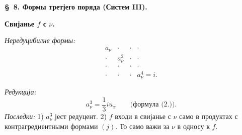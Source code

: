 ﻿\documentclass[11pt]{article}
\begin{document}
\begin{center}
\textbf{\S\ 8. \quad Формы третјего поряда (Систем III).}
\end{center}

\noindent\textbf{Свијанье $f$ с $\nu$.}

\noindent\textit{Нередуцибилне формы:}
\[
\begin{array}{cccc}
a_\nu&\cdot&\cdot&\cdot\\
\cdot&a_\nu^2&\cdot&\cdot\\
\cdot&\cdot&\cdot&\cdot\\
\cdot&\cdot&\cdot&a_\nu^4=i.
\end{array}
\]

\noindent\textit{Редукција:}
\[
a_\nu^3=\frac13 i u_x\qquad\text{(формула (2.)).}
\]
\noindent\textit{Последки:} 1) $a_\nu^3$ јест редуцент. 2) $f$ входи в свијанье с $\nu$ само в продуктах с контрагредиентными формами $(j)$. То само важи за $\nu$ в односу к $f$.
\end{document}
